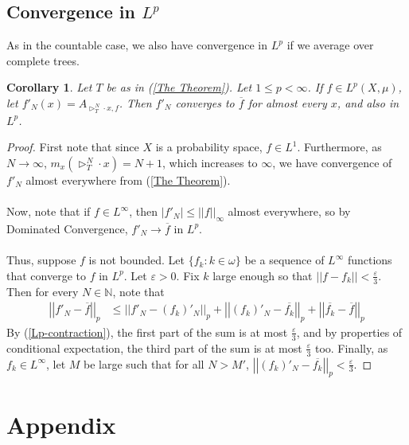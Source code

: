 \documentclass{article}
\newcommand{\norm}[1]{\left\vert\left\vert#1\right\vert\right\vert}
\newcommand{\abs}[1]{\left\vert#1\right\vert}
\let\oldref\ref
\renewcommand{\ref}[1]{(\oldref{#1})}
\newtheorem{corollary}[theorem]{Corollary}
\theoremstyle{definition}
\begin{document}
\subsection{Convergence in \texorpdfstring{$L^p$}{Lp}}
\noindent As in the countable case, we also have convergence in $ L^p $ if we average over complete trees. 
\begin{corollary}
    Let $ T $ be as in \ref{The Theorem}. Let $ 1\leq p < \infty $. If $ f\in L^p(X,\mu) $, let $ f'_N(x) = A_{\triangleright^N_T\cdot x, f} $. Then $ f'_N $ converges to $ \overline{f} $ for almost every $ x $, and also in $ L^p $.
\end{corollary}
\begin{proof}
    First note that since $ X $ is a probability space, $ f\in L^1 $. Furthermore, as $ N\to \infty $, $ m_x(\triangleright^N_T\cdot x) = N+1 $, which increases to $ \infty $, we have convergence of $ f'_N $ almost everywhere from \ref{The Theorem}. \\\\
    Now, note that if $ f\in L^\infty $, then $ \abs{f'_N}\leq \norm{f}_\infty $ almost everywhere, so by Dominated Convergence, $ f'_N\to \overline{f} $ in $ L^p $.\\\\
    Thus, suppose $ f $ is not bounded. Let $ \{f_k:k\in \omega\} $ be a sequence of $ L^\infty $ functions that converge to $ f $ in $ L^p $. Let $ \varepsilon>0 $. Fix $ k $ large enough so that $ \norm{f-f_k}<\frac{\varepsilon}{3} $. Then for every $ N\in \mathbb{N} $, note that
    \begin{align*}
        \norm{f'_N - \overline{f}}_p &\leq \norm{f'_N - (f_k)'_N}_p + \norm{(f_k)'_N - \overline{f_k}}_p + \norm{\overline{f_k} - \overline{f}}_p
    \end{align*}
    By \ref{Lp-contraction}, the first part of the sum is at most $ \frac{\varepsilon}{3} $, and by properties of conditional expectation, the third part of the sum is at most $ \frac{\varepsilon}{3} $ too. Finally, as $ f_k\in L^\infty $, let $ M $ be large such that for all $ N>M' $, $ \norm{(f_k)'_N - \overline{f_k}}_p <\frac{\varepsilon}{3}$. 
\end{proof}
\section{Appendix}
\end{document}
